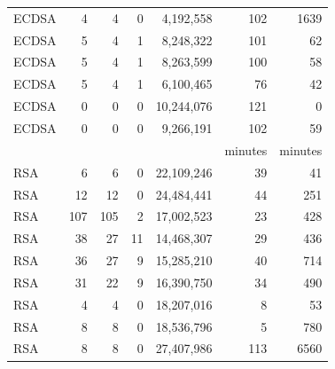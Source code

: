 \begin{table}[]
\begin{threeparttable}
\begin{tabular}{l@{}r@{~~}rrr@{~~}rr}
        ECDSA\tnote{3}              &   4                   &   4                 & 0                    &  4,192,558    & 102   & 1639          \\   
        ECDSA\tnote{4}              &  5                    & 4                   & 1                    &  8,248,322       & 101     & 62           \\   
        ECDSA\tnote{5}              &  5                    & 4                   & 1                    &  8,263,599      & 100     & 58            \\   
        ECDSA\tnote{6}              &  5                    & 4                   & 1                    &  6,100,465       & 76      & 42                  \\  
        ECDSA\tnote{7}              & 0                      &  0                   &    0               &  10,244,076       &  121     & 0                  \\  
        ECDSA\tnote{8}              & 0                      &  0                   &  0                 &  9,266,191          & 102     & 59        \\  


                           &                        &                     &                      &                 & minutes   & minutes         \\\cline{6-7}
        RSA\tnote{1}                & 6                       & 6                   & 0                    & 22,109,246    & 39     & 41           \\
        RSA\tnote{2}                & 12                      & 12                  & 0                    & 24,484,441    & 44     & 251           \\
        RSA\tnote{4}                & 107                    & 105                 & 2                    & 17,002,523   & 23      & 428           \\
        RSA\tnote{5}                & 38                     & 27                  & 11                   & 14,468,307   & 29     & 436          \\
        RSA\tnote{6}                & 36                     & 27                  & 9                    & 15,285,210   & 40     & 714          \\
        RSA\tnote{7}                & 31                     & 22                  & 9                    & 16,390,750   & 34      & 490         \\
        RSA\tnote{8}                & 4                      &  4                  & 0                    & 18,207,016   & 8      & 53          \\
        RSA\tnote{9}                & 8                      &  8                  & 0                    & 18,536,796    & 5      & 780         \\
        RSA\tnote{10}               & 8                      &  8                  & 0                    & 27,407,986    & 113    & 6560       \\


\end{tabular}
\end{threeparttable}
\end{table}

